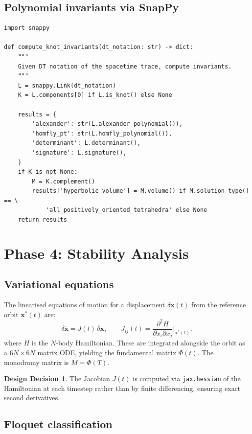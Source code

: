 \documentclass[12pt, a4paper]{article}
\theoremstyle{definition}
\newtheorem{decision}{Design Decision}
\begin{document}
\subsection{Polynomial invariants via SnapPy}

\begin{lstlisting}[style=python, caption={Knot invariant computation.}]
import snappy

def compute_knot_invariants(dt_notation: str) -> dict:
    """
    Given DT notation of the spacetime trace, compute invariants.
    """
    L = snappy.Link(dt_notation)
    K = L.components[0] if L.is_knot() else None

    results = {
        'alexander': str(L.alexander_polynomial()),
        'homfly_pt': str(L.homfly_polynomial()),
        'determinant': L.determinant(),
        'signature': L.signature(),
    }
    if K is not None:
        M = K.complement()
        results['hyperbolic_volume'] = M.volume() if M.solution_type() == \
            'all_positively_oriented_tetrahedra' else None
    return results
\end{lstlisting}

\section{Phase 4: Stability Analysis}
\label{sec:stability}

\subsection{Variational equations}

The linearised equations of motion for a displacement $\delta\mathbf{x}(t)$
from the reference orbit $\mathbf{x}^*(t)$ are:
\[
  \delta\dot{\mathbf{x}} = J(t)\,\delta\mathbf{x},
  \qquad
  J_{ij}(t) = \frac{\partial^2 H}{\partial x_i \partial x_j}\bigg|_{\mathbf{x}^*(t)},
\]
where $H$ is the $N$-body Hamiltonian.  These are integrated alongside the
orbit as a $6N \times 6N$ matrix ODE, yielding the fundamental matrix
$\Phi(t)$.  The monodromy matrix is $M = \Phi(T)$.

\begin{decision}
The Jacobian $J(t)$ is computed via \texttt{jax.hessian} of the Hamiltonian
at each timestep rather than by finite differencing, ensuring exact second
derivatives.
\end{decision}

\subsection{Floquet classification}
\end{document}
